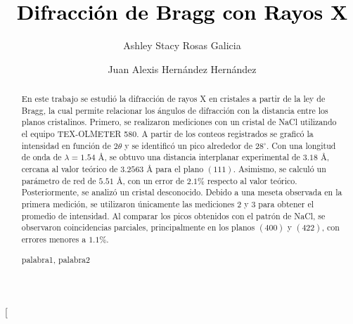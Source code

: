 \documentclass[journal]{IEEEtran}
\begin{document}
	
	\title{\textcolor{black}{Difracción de Bragg con Rayos X}}  
	
	\author{Ashley Stacy Rosas Galicia}
	\author{Juan Alexis Hernández Hernández}
	
	\twocolumn[
	\begin{@twocolumnfalse}
		\maketitle
		\thispagestyle{firstpage}
	\end{@twocolumnfalse}
	
	\begin{abstract}
		En este trabajo se estudió la difracción de rayos X en cristales a partir de la ley de Bragg, la cual permite relacionar los ángulos de difracción con la distancia entre los planos cristalinos. Primero, se realizaron mediciones con un cristal de NaCl utilizando el equipo TEX-OLMETER 580. A partir de los conteos registrados se graficó la intensidad en función de $2\theta$ y se identificó un pico alrededor de $28^\circ$. Con una longitud de onda de $\lambda=1.54$ \AA, se obtuvo una distancia interplanar experimental de $3.18$ \AA, cercana al valor teórico de $3.2563$ \AA{} para el plano $(111)$. Asimismo, se calculó un parámetro de red de $5.51$ \AA{}, con un error de $2.1\%$ respecto al valor teórico. Posteriormente, se analizó un cristal desconocido. Debido a una meseta observada en la primera medición, se utilizaron únicamente las mediciones 2 y 3 para obtener el promedio de intensidad. Al comparar los picos obtenidos con el patrón de NaCl, se observaron coincidencias parciales, principalmente en los planos $(400)$ y $(422)$, con errores menores a $1.1\%$. 
		\vspace{2mm}
		
		\begin{IEEEkeywords}
			palabra1, palabra2
		\end{IEEEkeywords}
	\end{abstract}
	\bigskip
	
\end{document}
